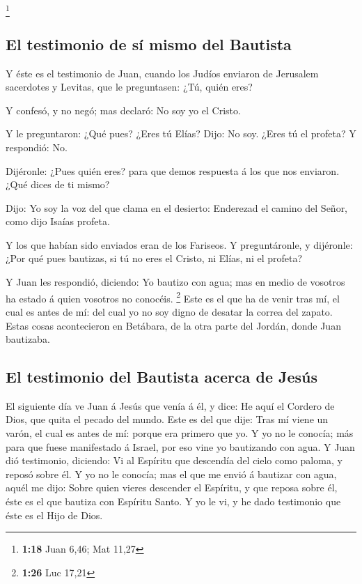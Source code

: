\footnote{\textbf{1:18} Juan 6,46; Mat 11,27}

\hypertarget{el-testimonio-de-suxed-mismo-del-bautista}{%
\subsection{El testimonio de sí mismo del
Bautista}\label{el-testimonio-de-suxed-mismo-del-bautista}}

 Y éste es el testimonio de Juan, cuando los Judíos
enviaron de Jerusalem sacerdotes y Levitas, que le preguntasen: ¿Tú,
quién eres?

 Y confesó, y no negó; mas declaró: No soy yo el Cristo.

 Y le preguntaron: ¿Qué pues? ¿Eres tú Elías? Dijo: No
soy. ¿Eres tú el profeta? Y respondió: No.~

 Dijéronle: ¿Pues quién eres? para que demos respuesta á
los que nos enviaron. ¿Qué dices de ti mismo?

 Dijo: Yo soy la voz del que clama en el desierto:
Enderezad el camino del Señor, como dijo Isaías profeta.

 Y los que habían sido enviados eran de los Fariseos.
 Y preguntáronle, y dijéronle: ¿Por qué pues bautizas, si
tú no eres el Cristo, ni Elías, ni el profeta?

 Y Juan les respondió, diciendo: Yo bautizo con agua; mas
en medio de vosotros ha estado á quien vosotros no conocéis. \footnote{\textbf{1:26}
  Luc 17,21}  Este es el que ha de venir tras mí, el cual
es antes de mí: del cual yo no soy digno de desatar la correa del
zapato.  Estas cosas acontecieron en Betábara, de la otra
parte del Jordán, donde Juan bautizaba.

\hypertarget{el-testimonio-del-bautista-acerca-de-jesuxfas}{%
\subsection{El testimonio del Bautista acerca de
Jesús}\label{el-testimonio-del-bautista-acerca-de-jesuxfas}}

 El siguiente día ve Juan á Jesús que venía á él, y dice:
He aquí el Cordero de Dios, que quita el pecado del mundo.
 Este es del que dije: Tras mí viene un varón, el cual es
antes de mí: porque era primero que yo.  Y yo no le
conocía; más para que fuese manifestado á Israel, por eso vine yo
bautizando con agua.  Y Juan dió testimonio, diciendo: Vi
al Espíritu que descendía del cielo como paloma, y reposó sobre él.
 Y yo no le conocía; mas el que me envió á bautizar con
agua, aquél me dijo: Sobre quien vieres descender el Espíritu, y que
reposa sobre él, éste es el que bautiza con Espíritu Santo.
 Y yo le vi, y he dado testimonio que éste es el Hijo de
Dios.

